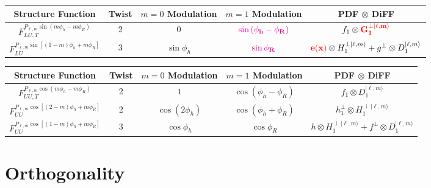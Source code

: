 \documentclass[12pt]{article}
\begin{document}
\begin{center}
\begin{tabular}{|c|c|c|c|c|}
\hline

Structure Function & Twist & 
$m=0$ Modulation & $m=1$ Modulation & PDF $\otimes$ DiFF \\\hline\hline

$F_{LU,T}^{P_{\ell,m}\sin\left(m\phi_h-m\phi_R\right)}$ & 2 &
$0$ & ${\bf\color{magenta}\sin\left(\phi_h-\phi_R\right)}$ &
$f_1\otimes {\bf\color{red}G_1^{\perp|\ell,m\rangle}}$\\\hline

$F_{LU}^{P_{\ell,m}\sin\left[(1-m)\phi_h+m\phi_R\right]}$ & 3 &
$\sin\phi_h$ & ${\bf\color{magenta}\sin\phi_R}$ &
${\bf\color{red}e(x)}\otimes H_1^{\perp|\ell,m\rangle}+
g^{\perp}\otimes D_1^{|\ell,m\rangle}$\\\hline

\end{tabular}
\end{center}

\begin{center}
\begin{tabular}{|c|c|c|c|c|}
\hline

Structure Function & Twist & 
$m=0$ Modulation & $m=1$ Modulation & PDF $\otimes$ DiFF \\\hline\hline

$F_{UU,T}^{P_{\ell,m}\cos\left(m\phi_h-m\phi_R\right)}$ & 2 &
$1$ & $\cos\left(\phi_h-\phi_R\right)$ &
$f_1\otimes D_1^{|\ell,m\rangle}$\\\hline

$F_{UU}^{P_{\ell,m}\cos\left[(2-m)\phi_h+m\phi_R\right]}$ & 2 &
$\cos\left(2\phi_h\right)$ & $\cos\left(\phi_h+\phi_R\right)$ &
$h_1^{\perp}\otimes H_1^{\perp|\ell,m\rangle}$\\\hline

$F_{UU}^{P_{\ell,m}\cos\left[(1-m)\phi_h+m\phi_R\right]}$ & 3 &
$\cos\phi_h$ & $\cos\phi_R$ &
$h\otimes H_1^{\perp|\ell,m\rangle}+f^{\perp}\otimes D_1^{|\ell,m\rangle}$\\\hline

\end{tabular}
\end{center}






\section*{Orthogonality}
\end{document}
